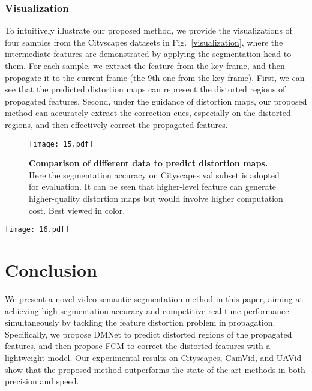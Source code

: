 \documentclass[journal]{IEEEtran}
\begin{document}
\subsubsection{Visualization}

To intuitively illustrate our proposed method, we provide the visualizations of four samples from the Cityscapes datasets in Fig.~\ref{visualization}, where the intermediate features are demonstrated by applying the segmentation head to them. For each sample, we extract the feature from the key frame, and then propagate it to the current frame (the $9$th one from the key frame). First, we can see that the predicted distortion maps can represent the distorted regions of propagated features. Second, under the guidance of distortion maps, our proposed method can accurately extract the correction cues, especially on the distorted regions, and then effectively correct the propagated features.


\begin{figure}[t]
	\begin{center}
		\texttt{[image: 15.pdf]}
	\end{center}
	\caption{\textbf{Comparison of different data to predict distortion maps.} Here the segmentation accuracy on Cityscapes val subset is adopted for evaluation. It can be seen that higher-level feature can generate higher-quality distortion maps but would involve higher computation cost. Best viewed in color.}	
	\label{exp_distortion_input_with_computation}
\end{figure}

\begin{figure*}[t]
	\begin{center}
		\texttt{[image: 16.pdf]}
	\end{center}
	\caption{\textbf{Visualization of some samples from Cityscapes.} It can be seen that the predicted distortion map can represent the distortion pattern of propagated features, and our proposed method can effectively correct the distorted features. Red rectangles highlight the main distorted regions. Best viewed in color.}	
	\label{visualization}
\end{figure*}

\section{Conclusion} \label{sec:conclusion}
We present a novel video semantic segmentation method in this paper, aiming at achieving high segmentation accuracy and competitive real-time performance simultaneously by tackling the feature distortion problem in propagation. Specifically, we propose DMNet to predict distorted regions of the propagated features, and then propose FCM to correct the distorted features with a lightweight model. Our experimental results on Cityscapes, CamVid, and UAVid show that the proposed method outperforms the state-of-the-art methods in both precision and speed.
\end{document}
